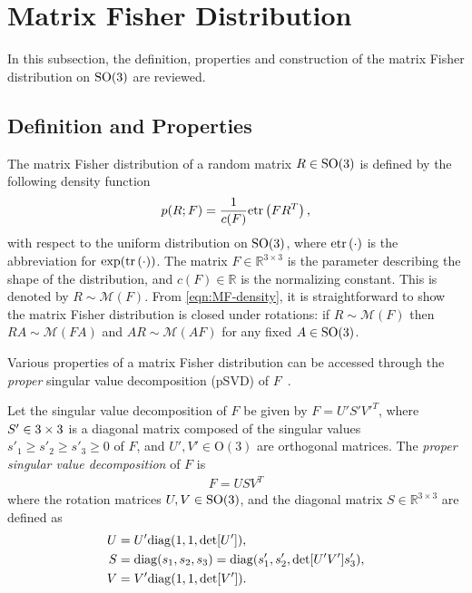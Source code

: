 \section{Matrix Fisher Distribution} \label{section:MF-MF}

In this subsection, the definition, properties and construction of the matrix Fisher distribution on $\mathrm{SO}(3)$ are reviewed.

\subsection{Definition and Properties}

The matrix Fisher distribution of a random matrix $R\in\mathrm{SO}(3)$ is defined by the following density function
\begin{equation} \label{eqn:MF-density}
	p(R;F) = \frac{1}{c(F)}\mathrm{etr}\left( FR^T \right),
\end{equation}
with respect to the uniform distribution on $\mathrm{SO}(3)$, where $\mathrm{etr}\left( \cdot \right)$ is the abbreviation for $\exp(\mathrm{tr}\left( \cdot \right))$.
The matrix $F\in\mathbb{R}^{3\times 3}$ is the parameter describing the shape of the distribution, and $c(F)\in\mathbb{R}$ is the normalizing constant.
This is denoted by $R\sim\mathcal{M}(F)$.
From \eqref{eqn:MF-density}, it is straightforward to show the matrix Fisher distribution is closed under rotations: if $R\sim\mathcal{M}(F)$ then $RA \sim \mathcal{M}(FA)$ and $AR \sim \mathcal{M}(AF)$ for any fixed $A\in\mathrm{SO}(3)$. 

Various properties of a matrix Fisher distribution can be accessed through the \textit{proper} singular value decomposition (pSVD) of $F$~\cite{khatri1977mises,lee2018bayesian,markley1988attitude}.

\begin{definition} \label{def:psvd}
	Let the singular value decomposition of $F$ be given by $F= U'S' V'^T$, where $S'\in\real{3\times3}$ is a diagonal matrix composed of the singular values $ s'_1\geq s'_2\geq s'_3\geq 0$ of $F$, and $U',V'\in\mathrm{O}(3)$ are orthogonal matrices.
	The \textit{proper singular value decomposition} of $F$ is 
	\begin{align}
		F=USV^T
	\end{align}
	where the rotation matrices $U,V\in\mathrm{SO}(3)$, and the diagonal matrix $S\in\mathbb{R}^{3\times 3}$ are defined as
	\begin{align}
		U &= U'\mathrm{diag}(1,1,\det[U']), \nonumber \\
		S &= \mathrm{diag}(s_1,s_2,s_3)=\mathrm{diag}(s'_1,s'_2,\det[U'V']s'_3), \nonumber \\
		V &= V'\mathrm{diag}(1,1,\det[V']).
	\end{align}
\end{definition}


